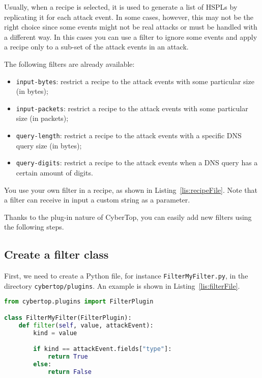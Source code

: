 \documentclass{scrartcl}
\begin{document}
Usually, when a recipe is selected, it is used to generate a list of HSPLs by replicating it for each attack event. In some cases, however, this may not be the right choice since some events might not be real attacks or must be handled with a different way. In this cases you can use a filter to ignore some events and apply a recipe only to a sub-set of the attack events in an attack.

The following filters are already available:

\begin{itemize}
	\item \lstinline|input-bytes|: restrict a recipe to the attack events with some particular size (in bytes);
	\item \lstinline|input-packets|: restrict a recipe to the attack events with some particular size (in packets);
	\item \lstinline|query-length|: restrict a recipe to the attack events with a specific DNS query size (in bytes);
	\item \lstinline|query-digits|: restrict a recipe to the attack events when a DNS query has a certain amount of digits.
\end{itemize}

You use your own filter in a recipe, as shown in Listing~\ref{lis:recipeFile}. Note that a filter can receive in input a custom string as a parameter.

Thanks to the plug-in nature of CyberTop, you can easily add new filters using the following steps.

\subsection{Create a filter class}

First, we need to create a Python file, for instance \lstinline|FilterMyFilter.py|, in the directory \lstinline|cybertop/plugins|. An example is shown in Listing~\ref{lis:filterFile}.

\begin{lstlisting}[language = Python, caption = Example of a filter plug-in., label = lis:filterFile]
from cybertop.plugins import FilterPlugin

class FilterMyFilter(FilterPlugin):
	def filter(self, value, attackEvent):
		kind = value

		if kind == attackEvent.fields["type"]:
			return True
		else:
			return False
\end{lstlisting}
\end{document}
